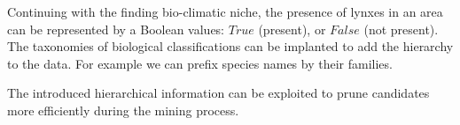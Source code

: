 \documentclass[12pt,a4paper,draft]{article}
\begin{document}
Continuing with the finding bio-climatic niche, the presence of lynxes in an area can be represented by a Boolean values: $True$ (present), or $False$ (not present). The taxonomies of biological classifications can be implanted to add the hierarchy to the data. For example we can prefix species names by their families.

The introduced hierarchical information can be exploited to prune candidates more efficiently during the mining process.
\end{document}

